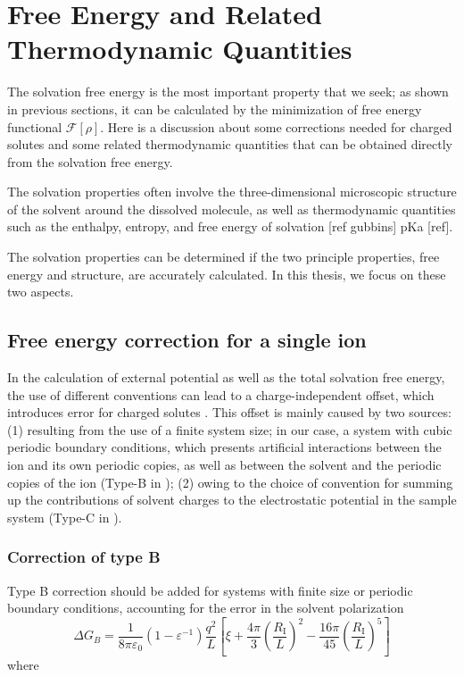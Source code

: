 
\chapter{Free Energy and Related Thermodynamic Quantities\label{chpt:thermodynamic-quantities}}

The solvation free energy is the most important property that we seek;
as shown in previous sections, it can be calculated by the minimization
of free energy functional $\mathcal{F}[\rho]$. Here is a discussion
about some corrections needed for charged solutes and some related
thermodynamic quantities that can be obtained directly from the solvation
free energy.

The solvation properties often involve the three-dimensional microscopic
structure of the solvent around the dissolved molecule, as well as
thermodynamic quantities such as the enthalpy, entropy, and free
energy of solvation {[}ref gubbins{]} pKa {[}ref{]}.

The solvation properties can be determined if the two principle properties, free energy and structure,
are accurately calculated. In this thesis,
we focus on these two aspects.


\section{Free energy correction for a single ion}

In the calculation of external potential as well as the total solvation
free energy, the use of different conventions can lead to a charge-independent
offset, which introduces error for charged solutes \citep{Kastenholz_2006_I,Kastenholz_2006_II,Hunenberger_book}.
This offset is mainly caused by two sources: (1) resulting from the use of
a finite system size; in our case, a system with cubic periodic
boundary conditions, which presents artificial interactions between
the ion and its own periodic copies, as well as between the solvent
and the periodic copies of the ion (Type-B in \citep{Kastenholz_2006_II});
(2) owing to the choice of convention for summing up the contributions
of solvent charges to the electrostatic potential in the sample system
(Type-C in \citep{Kastenholz_2006_II}).


\subsection{Correction of type B}

Type B correction should be added for systems with finite size or
periodic boundary conditions, accounting for the error in the solvent
polarization 
\begin{equation}
\Delta G_{B}=\frac{1}{8\pi\varepsilon_{0}}\left(1-\varepsilon^{-1}\right)\frac{q^{2}}{L}\left[\xi+\frac{4\pi}{3}\left(\frac{R_{\mathrm{I}}}{L}\right)^{2}-\frac{16\pi}{45}\left(\frac{R_{\mathrm{I}}}{L}\right)^{5}\right]\label{eq:corr-B}
\end{equation}
where

